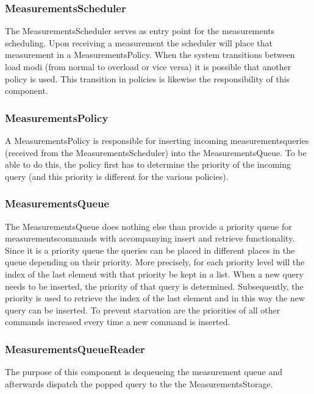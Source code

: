 \subsubsection{MeasurementsScheduler}

\npar The MeasurementsScheduler serves as entry point for the measurements
scheduling. Upon receiving a measurement the scheduler will place that
measurement in a MeasurementsPolicy. When the system transitions between load
modi (from normal to overload or vice versa) it is possible that another policy
is used. This transition in policies is likewise the responsibility of this
component.

\subsubsection{MeasurementsPolicy}

\npar A MeasurementsPolicy is responsible for inserting incoming
measurementsqueries (received from the MeasurementsScheduler) into the
MeasurementsQueue. To be able to do this, the policy first has to determine the
priority of the incoming query (and this priority is different for the various
policies).

\subsubsection{MeasurementsQueue}

\npar The MeasurementsQueue does nothing else than provide a priority queue for
measurementscommands with accompanying insert and retrieve functionality. Since
it is a priority queue the queries can be placed in different places in the
queue depending on their priority. More precisely, for each priority level will
the index of the last element with that priority be kept in a list. When a new
query needs to be inserted, the priority of that query is determined.
Subsequently, the priority is used to retrieve the index of the last element and
in this way the new query can be inserted. To prevent starvation are the
priorities of all other commands increased every time a new command is
inserted.

\subsubsection{MeasurementsQueueReader}

\npar The purpose of this component is dequeueing the measurement queue and
afterwards dispatch the popped query to the the MeasurementsStorage.

